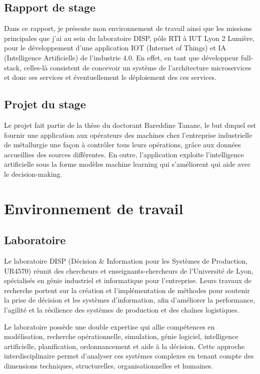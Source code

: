 \documentclass{template}
\begin{document}
\subsection{Rapport de stage}
Dans ce rapport, je présente mon environnement de travail ainsi que les missions principales que j’ai au sein du laboratoire DISP, pôle RTI à IUT Lyon 2 Lumière, pour le développement d'une application IOT (Internet of Things) et IA (Intelligence Artificielle) de l'industrie 4.0. En effet, en tant que développeur full-stack, celles-là consistent de concevoir un système de l'architecture microservices et donc ses services et éventuellement le déploiement des ces services. 
\subsection{Projet du stage}
Le projet fait partie de la thèse du doctorant Bareddine Tanane, le but duquel est fournir une application aux opérateurs des machines chez l'entreprise industrielle de métallurgie une façon à contrôler tous leurs opérations, grâce aux données accueillies des sources différentes. En outre, l'application exploite l'intelligence artificielle sous la forme modèles machine learning qui s'améliorent qui aide avec le decision-making.


\newpage
\section{Environnement de travail}
\subsection{Laboratoire}
Le laboratoire DISP (Décision \& Information pour les Systèmes de Production, UR4570) réunit des chercheurs et enseignants-chercheurs de l'Université de Lyon, spécialisés en génie industriel et informatique pour l'entreprise. Leurs travaux de recherche portent sur la création et l'implémentation de méthodes pour soutenir la prise de décision et les systèmes d'information, afin d'améliorer la performance, l'agilité et la résilience des systèmes de production et des chaînes logistiques.

Le laboratoire possède une double expertise qui allie compétences en modélisation, recherche opérationnelle, simulation, génie logiciel, intelligence artificielle, planification, ordonnancement et aide à la décision. Cette approche interdisciplinaire permet d'analyser ces systèmes complexes en tenant compte des dimensions techniques, structurelles, organisationnelles et humaines.
\end{document}
